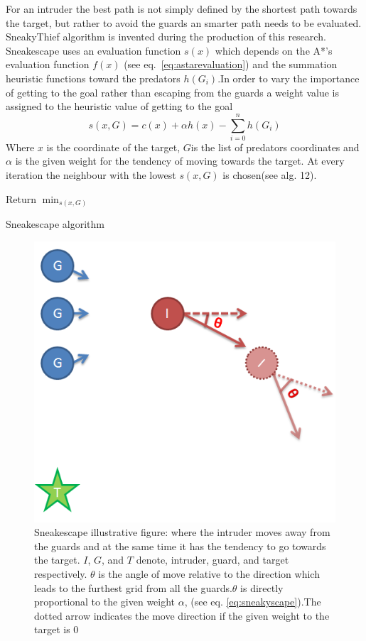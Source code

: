 For an intruder the best path is not simply defined by the shortest path towards the target, but rather to avoid the guards an smarter path needs to be evaluated. SneakyThief algorithm is invented during the production of this research.
			Sneakescape uses an evaluation function $s(x)$ which depends on the A*'s evaluation function $f(x)$ (see eq.~\ref{eq:astarevaluation}) and the summation heuristic functions toward the predators $h(G_i)$.In order to vary the importance of getting to the goal rather than escaping from the guards a weight value is assigned to the heuristic value of getting to the goal
			\label{sec:SneakyEs}
			\begin{equation}
				\label{eq:sneakyscape}
			 	s(x,G) = c(x) + \alpha h(x) - \sum_{i=0}^n h(G_i)
			\end{equation} 
			Where $x$ is the coordinate of the target, $G$is the list of predators coordinates and $\alpha$ is the given weight for the tendency of moving towards the target. At every iteration the neighbour with the lowest $s(x,G)$ is chosen(see alg. 12).
	\begin{algorithm}
	 \label{alg:sneakescape}
				Return $\min_{s(x,G)}$ \;
				\caption{Sneakescape algorithm}
			\end{algorithm}
			
	\begin{figure}
	    \includegraphics[width=\columnwidth]{SneakyStuff.PNG}
	    \caption{Sneakescape illustrative figure: where the intruder moves away from the guards and at the same time it has the tendency to go towards the target. $I$, $G$, and $T$ denote, intruder, guard, and target respectively. $\theta$ is the angle of move relative to the direction which leads to the furthest grid from all the guards.$\theta$ is directly proportional to the given weight $\alpha$, (see eq. \ref{eq:sneakyscape}).The dotted arrow indicates the move direction if the given weight to the target is $0$}
	\end{figure}
